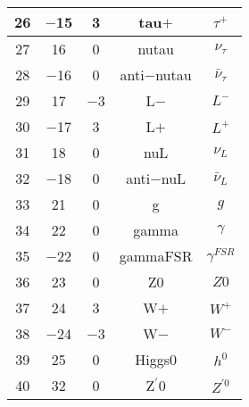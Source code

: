 \documentclass{article}
\begin{document}
\begin{table}[!htbp]
\begin{tabular}{|c|c|c|c|c|}
\hline
26 & $-$15 & 3 & tau$+$ & $\tau^{+}$ \\
\hline
27 & 16 & 0 & nu\underline{\hspace{0.6em}}tau & $\nu_{\tau}$ \\
\hline
28 & $-$16 & 0 & anti$-$nu\underline{\hspace{0.6em}}tau & $\bar{\nu}_{\tau}$ \\
\hline
29 & 17 & $-$3 & L$-$ & $L^{-}$ \\
\hline
30 & $-$17 & 3 & L$+$ & $L^{+}$ \\
\hline
31 & 18 & 0 & nu\underline{\hspace{0.6em}}L & $\nu_{L}$ \\
\hline
32 & $-$18 & 0 & anti$-$nu\underline{\hspace{0.6em}}L & $\bar{\nu}_{L}$ \\
\hline
33 & 21 & 0 & g & $g$ \\
\hline
34 & 22 & 0 & gamma & $\gamma$ \\
\hline
35 & $-$22 & 0 & gammaFSR & $\gamma^{FSR}$ \\
\hline
36 & 23 & 0 & Z0 & $Z0$ \\
\hline
37 & 24 & 3 & W$+$ & $W^{+}$ \\
\hline
38 & $-$24 & $-$3 & W$-$ & $W^{-}$ \\
\hline
39 & 25 & 0 & Higgs0 & $h^{0}$ \\
\hline
40 & 32 & 0 & Z$^{\prime}$0 & $Z^{\prime0}$ \\
\hline
\end{tabular}
\end{table}

\clearpage
\end{document}
